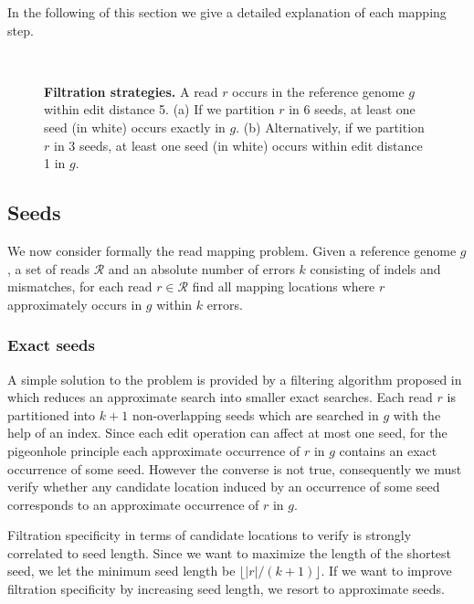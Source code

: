 \documentclass[a4,center,fleqn]{article}
\begin{document}
In the following of this section we give a detailed explanation of each mapping step.

\begin{figure}[h]
\centering
{}
\\
\vspace{5mm}
\caption{
{\bfseries Filtration strategies.}
A read $r$ occurs in the reference genome $g$ within edit distance 5.
(a) If we partition $r$ in 6 seeds, at least one seed (in white) occurs exactly in $g$.
(b) Alternatively, if we partition $r$ in 3 seeds, at least one seed (in white) occurs within edit distance 1 in $g$.
}
\label{fig:FiltrationStrategies}
\end{figure}


\subsection{Seeds}
We now consider formally the read mapping problem.
Given a reference genome $g$, a set of reads $\mathcal{R}$ and an absolute number of errors $k$ consisting of indels and mismatches, for each read $r \in \mathcal{R}$ find all mapping locations where $r$ approximately occurs in $g$ within $k$ errors.

\subsubsection{Exact seeds}
A simple solution to the problem is provided by a filtering algorithm proposed in \cite{Baeza1999b} which reduces an approximate search into smaller exact searches.
Each read $r$ \textcolor{black}{is} partitioned into $k+1$ non-overlapping seeds which \textcolor{black}{are} searched in $g$ with the help of an index.
Since each edit operation can affect at most one seed, for the pigeonhole principle each approximate occurrence of $r$ in $g$ contains an exact occurrence of some seed.
However the converse is not true, consequently we must verify whether any candidate location induced by an occurrence of some seed corresponds to an approximate occurrence of $r$ in $g$.

Filtration specificity in terms of candidate locations to verify is strongly correlated to seed length.
Since we want to maximize the length of the shortest seed, we let the minimum seed length be $\lfloor |r|/(k+1) \rfloor$.
If we want to improve filtration specificity by increasing seed length, we resort to approximate seeds.
\end{document}
